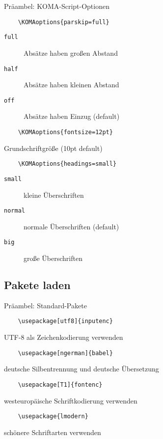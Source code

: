 \begin{frame}[fragile]{Präambel: KOMA-Script-Optionen}

  \begin{lstlisting}
    \KOMAoptions{parskip=full}
  \end{lstlisting}
  \begin{description}
    \item[\texttt{full}] Absätze haben großen Abstand
    \item[\texttt{half}] Absätze haben kleinen Abstand
    \item[\texttt{off}] Absätze haben Einzug (default)
  \end{description}

  \begin{lstlisting}
    \KOMAoptions{fontsize=12pt}
  \end{lstlisting}
  Grundschriftgröße (10pt default)

  \begin{lstlisting}
    \KOMAoptions{headings=small}
  \end{lstlisting}
  \begin{description}
    \item[\texttt{small}] kleine Überschriften
    \item[\texttt{normal}] normale Überschriften (default)
    \item[\texttt{big}] große Überschriften
  \end{description}
\end{frame}

\subsection{Pakete laden}

\begin{frame}[fragile]{Präambel: Standard-Pakete}
  
  \begin{lstlisting}
    \usepackage[utf8]{inputenc}
  \end{lstlisting}
  UTF-8 als Zeichenkodierung verwenden
  
  \begin{lstlisting}
    \usepackage[ngerman]{babel}
  \end{lstlisting}
  deutsche Silbentrennung und deutsche Übersetzung
  
  \begin{lstlisting}
    \usepackage[T1]{fontenc}
  \end{lstlisting}
  westeuropäische Schriftkodierung verwenden
  
  \begin{lstlisting}
    \usepackage{lmodern}
  \end{lstlisting}
  schönere Schriftarten verwenden
\end{frame}

